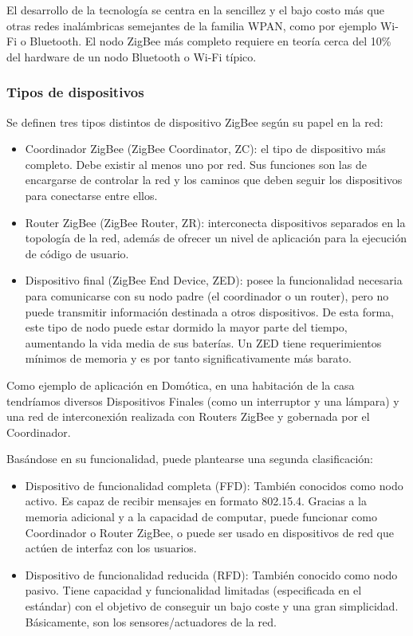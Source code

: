 El desarrollo de la tecnolog\'ia se centra en la sencillez y el bajo costo m\'as que otras redes inal\'ambricas semejantes de la familia WPAN, como por ejemplo Wi-Fi o Bluetooth. El nodo ZigBee m\'as completo requiere en teor\'ia cerca del 10\% del hardware de un nodo Bluetooth o Wi-Fi t\'ipico.

\subsubsection{Tipos de dispositivos}
Se definen tres tipos distintos de dispositivo ZigBee seg\'un su papel en la red:

\begin{itemize}
\item Coordinador ZigBee (ZigBee Coordinator, ZC): el tipo de dispositivo m\'as completo. Debe existir al menos uno por red. Sus funciones son las de encargarse de controlar la red y los caminos que deben seguir los dispositivos para conectarse entre ellos.
\item Router ZigBee (ZigBee Router, ZR): interconecta dispositivos separados en la topolog\'ia de la red, adem\'as de ofrecer un nivel de aplicaci\'on para la ejecuci\'on de c\'odigo de usuario.
\item Dispositivo final (ZigBee End Device, ZED): posee la funcionalidad necesaria para comunicarse con su nodo padre (el coordinador o un router), pero no puede transmitir informaci\'on destinada a otros dispositivos. De esta forma, este tipo de nodo puede estar dormido la mayor parte del tiempo, aumentando la vida media de sus bater\'ias. Un ZED tiene requerimientos m\'inimos de memoria y es por tanto significativamente m\'as barato.
\end{itemize}
Como ejemplo de aplicaci\'on en Dom\'otica, en una habitaci\'on de la casa tendr\'iamos diversos Dispositivos Finales (como un interruptor y una l\'ampara) y una red de interconexi\'on realizada con Routers ZigBee y gobernada por el Coordinador.

Bas\'andose en su funcionalidad, puede plantearse una segunda clasificaci\'on:

\begin{itemize}
\item Dispositivo de funcionalidad completa (FFD): Tambi\'en conocidos como nodo activo. Es capaz de recibir mensajes en formato 802.15.4. Gracias a la memoria adicional y a la capacidad de computar, puede funcionar como Coordinador o Router ZigBee, o puede ser usado en dispositivos de red que act\'uen de interfaz con los usuarios.
\item Dispositivo de funcionalidad reducida (RFD): Tambi\'en conocido como nodo pasivo. Tiene capacidad y funcionalidad limitadas (especificada en el est\'andar) con el objetivo de conseguir un bajo coste y una gran simplicidad. B\'asicamente, son los sensores/actuadores de la red.
\end{itemize}



